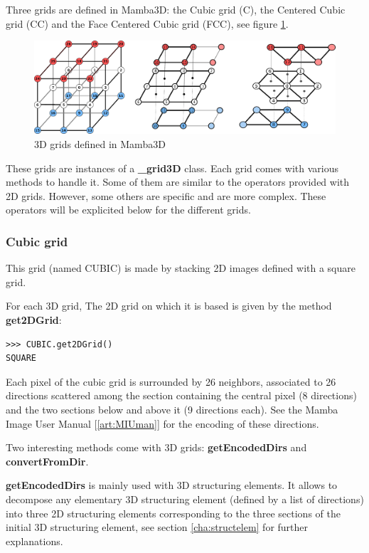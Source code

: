 \documentclass[a4paper,10pt,oneside]{article}
\begin{document}
Three grids are defined in Mamba3D: the Cubic grid (C), the Centered Cubic grid (CC) and the Face Centered Cubic grid (FCC),
see figure \ref{fig:3D_grids}.

\begin{figure}
\centering
\includegraphics[scale=0.6]{figures/3D_grids.pdf}
\caption{3D grids defined in Mamba3D}
\label{fig:3D_grids}
\end{figure}

These grids are instances of a \textbf{\_grid3D} class. Each grid comes with various methods to handle it. Some of them are similar to
the operators provided with 2D grids. However, some others are specific and are more complex. These operators will be explicited
below for the different grids.

\subsubsection{Cubic grid}
This grid (named CUBIC) is made by stacking 2D images defined with a square grid.

For each 3D grid, The 2D grid on which it is based is given by the method \textbf{get2DGrid}:

\lstset{language=Python}
\begin{lstlisting}
>>> CUBIC.get2DGrid()
SQUARE
\end{lstlisting}

Each pixel of the cubic grid is surrounded by 26 neighbors, associated to 26 directions scattered among the section containing the
central pixel (8 directions) and the two sections below and above it (9 directions each). See the Mamba Image User Manual [\ref{art:MIUman}]
for the encoding of these directions.

Two interesting methods come with 3D grids: \textbf{getEncodedDirs} and \textbf{convertFromDir}.

\textbf{getEncodedDirs} is mainly used with 3D structuring elements. It allows to decompose any elementary 3D structuring element (defined
by a list of directions) into three 2D structuring elements corresponding to the three sections of the initial 3D structuring
element, see section \ref{cha:structelem} for further explanations.
\end{document}
